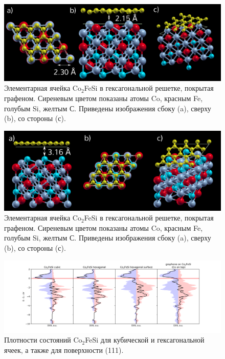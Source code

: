\documentclass[]{article}
\begin{document}
\begin{figure}[h]
    \centering
    \includegraphics[scale=0.6]{images/co2fesi-graphene-cell.png}
    \caption{Элементарная ячейка Co$_2$FeSi в гексагональной решетке, покрытая графеном. Сиреневым цветом показаны атомы Co, красным Fe, голубым Si, желтым С. Приведены изображения сбоку (a), сверху (b), со стороны (с). }
    \label{fig:graphene-cofe-cell}
\end{figure}

\begin{figure}[h]
    \centering
    \includegraphics[scale=0.6]{images/sico_cell.png}
    \caption{Элементарная ячейка Co$_2$FeSi в гексагональной решетке, покрытая графеном. Сиреневым цветом показаны атомы Co, красным Fe, голубым Si, желтым С. Приведены изображения сбоку (a), сверху (b), со стороны (с). }
    \label{fig:graphene-cofe-cell}
\end{figure}

\begin{figure}[h]
    \centering
    \includegraphics[scale=0.5]{images/070920_dos.png}
    \caption{Плотности состояний Co$_2$FeSi для кубической и гексагональной ячеек, а также для поверхности (111). }
    \label{fig:dos}
\end{figure}
\end{document}
